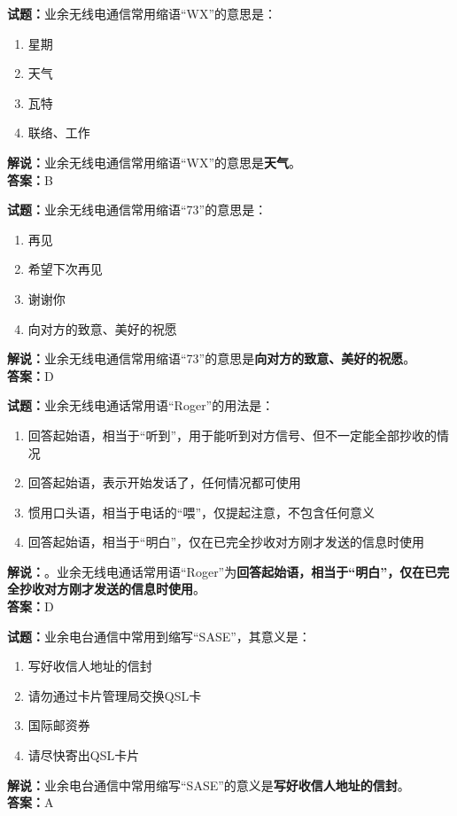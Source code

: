\documentclass{ctexbook}
\begin{document}
\bigskip


\noindent\textbf{试题：}业余无线电通信常用缩语“WX”的意思是：
\begin{enumerate}[leftmargin=3em]
\item 星期
\item 天气
\item 瓦特
\item 联络、工作
\end{enumerate}
\noindent\textbf{解说：}业余无线电通信常用缩语“WX”的意思是\textbf{天气}。\\\noindent\textbf{答案：}B


\bigskip


\noindent\textbf{试题：}业余无线电通信常用缩语“73”的意思是：
\begin{enumerate}[leftmargin=3em]
\item 再见
\item 希望下次再见
\item 谢谢你
\item 向对方的致意、美好的祝愿
\end{enumerate}
\noindent\textbf{解说：}业余无线电通信常用缩语“73”的意思是\textbf{向对方的致意、美好的祝愿}。\\\noindent\textbf{答案：}D



\bigskip


\noindent\textbf{试题：}业余无线电通话常用语“Roger”的用法是：
\begin{enumerate}[leftmargin=3em]
\item 回答起始语，相当于“听到”，用于能听到对方信号、但不一定能全部抄收的情况
\item 回答起始语，表示开始发话了，任何情况都可使用
\item 惯用口头语，相当于电话的“喂”，仅提起注意，不包含任何意义
\item 回答起始语，相当于“明白”，仅在已完全抄收对方刚才发送的信息时使用
\end{enumerate}
\noindent\textbf{解说：}。业余无线电通话常用语“Roger”为\textbf{回答起始语，相当于“明白”，仅在已完全抄收对方刚才发送的信息时使用}。\\\noindent\textbf{答案：}D


\bigskip


\noindent\textbf{试题：}业余电台通信中常用到缩写“SASE”，其意义是：
\begin{enumerate}[leftmargin=3em]
\item 写好收信人地址的信封
\item 请勿通过卡片管理局交换QSL卡
\item 国际邮资券
\item 请尽快寄出QSL卡片
\end{enumerate}
\noindent\textbf{解说：}业余电台通信中常用缩写“SASE”的意义是\textbf{写好收信人地址的信封}。\\\noindent\textbf{答案：}A
\end{document}
